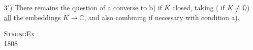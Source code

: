 $3^\circ$) There remains the question of a converse to b) if $K$  closed, taking ( if $K\ne\overline{\mathbb Q}$) \uline{all} the embeddings $K\longrightarrow\mathbb C$, and also combining if necessary with condition a).
\par\noindent\textsc{ Strong}\hfill\textsc{Ex}\\
 1808\hfill{}

